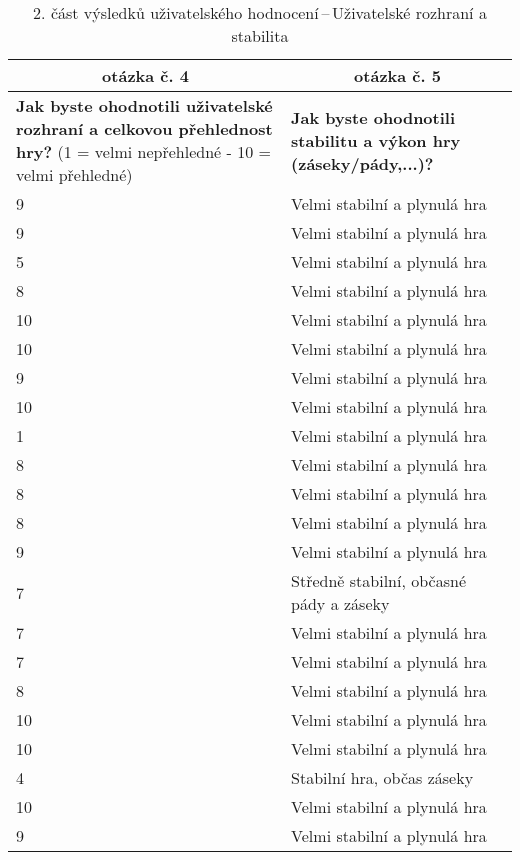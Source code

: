 \begin{table}[htbp]
\centering
\begin{tabularx}{\textwidth}{|X|X|}
\hline
\multicolumn{1}{|c|}{\textbf{otázka č. 4}} & \multicolumn{1}{c|}{\textbf{otázka č. 5}} \\ \hline
\textbf{Jak byste ohodnotili uživatelské rozhraní a celkovou přehlednost hry?} (1 = velmi nepřehledné - 10 = velmi přehledné) & \textbf{Jak byste ohodnotili stabilitu a výkon hry (záseky/pády,...)?} \\ \hline
9 & Velmi stabilní a plynulá hra \\ \hline
9 & Velmi stabilní a plynulá hra \\ \hline
5 & Velmi stabilní a plynulá hra \\ \hline
8 & Velmi stabilní a plynulá hra \\ \hline
10 & Velmi stabilní a plynulá hra \\ \hline
10 & Velmi stabilní a plynulá hra \\ \hline
9 & Velmi stabilní a plynulá hra \\ \hline
10 & Velmi stabilní a plynulá hra \\ \hline
1 & Velmi stabilní a plynulá hra \\ \hline
8 & Velmi stabilní a plynulá hra \\ \hline
8 & Velmi stabilní a plynulá hra \\ \hline
8 & Velmi stabilní a plynulá hra \\ \hline
9 & Velmi stabilní a plynulá hra \\ \hline
7 & Středně stabilní, občasné pády a záseky \\ \hline
7 & Velmi stabilní a plynulá hra \\ \hline
7 & Velmi stabilní a plynulá hra \\ \hline
8 & Velmi stabilní a plynulá hra \\ \hline
10 & Velmi stabilní a plynulá hra \\ \hline
10 & Velmi stabilní a plynulá hra \\ \hline
4 & Stabilní hra, občas záseky \\ \hline
10 & Velmi stabilní a plynulá hra \\ \hline
9 & Velmi stabilní a plynulá hra \\ \hline
\end{tabularx}
\caption{2. část výsledků uživatelského hodnocení\,--\,Uživatelské rozhraní a stabilita}
\end{table}

